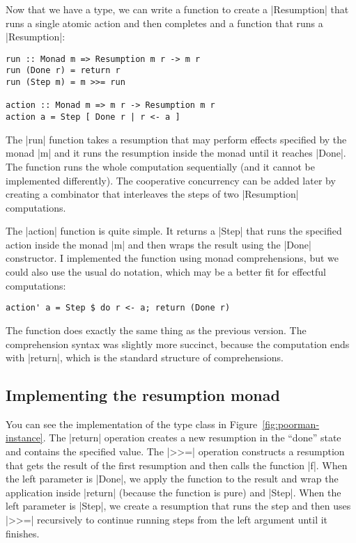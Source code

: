 \documentclass{tmr}
\begin{document}
Now that we have a type, we can write a function to create a |Resumption| that runs a single
atomic action and then completes and a function that runs a |Resumption|:

\begin{verbatim}
run :: Monad m => Resumption m r -> m r
run (Done r) = return r
run (Step m) = m >>= run

action :: Monad m => m r -> Resumption m r
action a = Step [ Done r | r <- a ]
\end{verbatim}
The |run| function takes a resumption that may perform effects specified by the monad |m| and it
runs the resumption inside the monad until it reaches |Done|. The function runs the whole 
computation sequentially (and it cannot be implemented differently). The cooperative concurrency
can be added later by creating a combinator that interleaves the steps of two |Resumption|
computations.

The |action| function is quite simple. It returns a |Step| that runs the specified action 
inside the monad |m| and then wraps the result using the |Done| constructor. I implemented the
function using monad comprehensions, but we could also use the usual do notation, which may be
a better fit for effectful computations:

\begin{verbatim}
action' a = Step $ do r <- a; return (Done r)
\end{verbatim}
The function does exactly the same thing as the previous version. The comprehension syntax was 
slightly more succinct, because the computation ends with |return|, which is the standard structure
of comprehensions.


\subsection{Implementing the resumption monad}
You can see the implementation of the  type class in Figure~\ref{fig:poorman-instance}. 
The |return| operation creates a new resumption in the ``done'' state and contains the specified 
value. The |>>=| operation constructs a resumption that gets the result of the 
first resumption and then calls the function |f|. When the left parameter is |Done|, we 
apply the function to the result and wrap the application inside |return| (because the function
is pure) and |Step|. When the left parameter is |Step|, we create a resumption that runs the
step and then uses |>>=| recursively to continue running steps from the left argument until it 
finishes.
\end{document}
